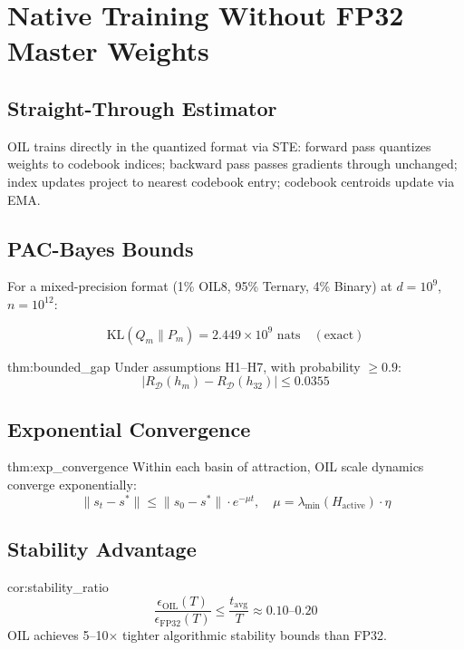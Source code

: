 \documentclass[11pt,a4paper]{article}
\theoremstyle{definition}
\newcommand{\KL}{\mathrm{KL}}
\begin{document}
\section{Native Training Without FP32 Master Weights}
\label{sec:training}

\subsection{Straight-Through Estimator}

OIL trains directly in the quantized format via STE: forward pass quantizes weights to codebook indices; backward pass passes gradients through unchanged; index updates project to nearest codebook entry; codebook centroids update via EMA.

\subsection{PAC-Bayes Bounds}

For a mixed-precision format (1\% OIL8, 95\% Ternary, 4\% Binary) at $d = 10^9$, $n = 10^{12}$:

\[
\KL(Q_m \| P_m) = 2.449 \times 10^9 \text{ nats} \quad (\text{exact})
\]

\begin{mythm}{thm:bounded_gap}
Under assumptions H1--H7, with probability $\geq 0.9$:
\[
|R_{\mathcal{D}}(h_m) - R_{\mathcal{D}}(h_{32})| \leq 0.0355
\]
\end{mythm}

\subsection{Exponential Convergence}

\begin{mythm}{thm:exp_convergence}
Within each basin of attraction, OIL scale dynamics converge exponentially:
\[
\|s_t - s^*\| \leq \|s_0 - s^*\| \cdot e^{-\mu t}, \quad \mu = \lambda_{\min}(H_{\text{active}}) \cdot \eta
\]
\end{mythm}

\subsection{Stability Advantage}

\begin{mycor}{cor:stability_ratio}
\[
\frac{\epsilon_{\text{OIL}}(T)}{\epsilon_{\text{FP32}}(T)} \leq \frac{t_{\text{avg}}}{T} \approx 0.10\text{--}0.20
\]
OIL achieves 5--10$\times$ tighter algorithmic stability bounds than FP32.
\end{mycor}
\end{document}
